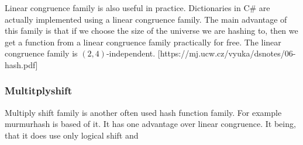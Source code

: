 Linear congruence family is also useful in practice. Dictionaries in C\# are actually implemented using a linear congruence family. The main advantage of this family is that if we choose the size of the universe we are hashing to, then we get a function from a linear congruence family practically for free. The linear congruence family is $(2,4)$-independent. 
[https://mj.ucw.cz/vyuka/dsnotes/06-hash.pdf]

\subsubsection{Multitplyshift}
Multiply shift family is another often used hash function family. For example murmurhash is based of it. It has one advantage over linear congruence. It being, that it does use only logical shift and 